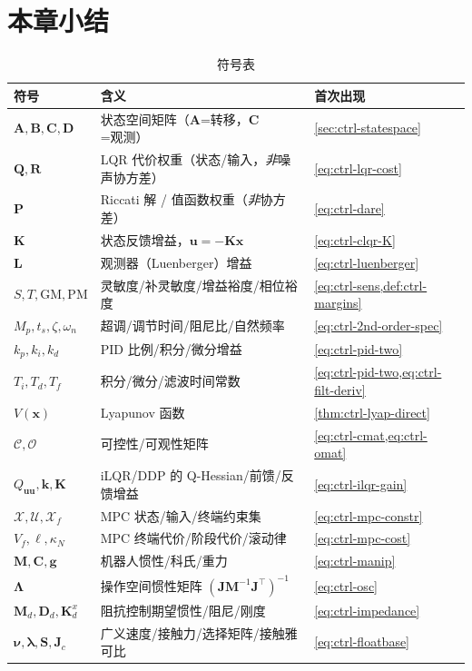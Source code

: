 \section*{本章小结}

\begin{table}[H]\centering\small
\caption{符号表}
\label{tab:ctrl-symbols}
\begin{tabular}{lll}
\toprule
符号 & 含义 & 首次出现 \\
\midrule
$\mathbf{A},\mathbf{B},\mathbf{C},\mathbf{D}$ & 状态空间矩阵（$\mathbf{A}$=转移，$\mathbf{C}$=观测） & \cref{sec:ctrl-statespace} \\
$\mathbf{Q},\mathbf{R}$ & LQR 代价权重（状态/输入，\emph{非}噪声协方差） & \cref{eq:ctrl-lqr-cost} \\
$\mathbf{P}$ & Riccati 解 / 值函数权重（\emph{非}协方差） & \cref{eq:ctrl-dare} \\
$\mathbf{K}$ & 状态反馈增益，$\mathbf{u}=-\mathbf{K}\mathbf{x}$ & \cref{eq:ctrl-clqr-K} \\
$\mathbf{L}$ & 观测器（Luenberger）增益 & \cref{eq:ctrl-luenberger} \\
$S,T,\mathrm{GM},\mathrm{PM}$ & 灵敏度/补灵敏度/增益裕度/相位裕度 & \cref{eq:ctrl-sens,def:ctrl-margins} \\
$M_p,t_s,\zeta,\omega_n$ & 超调/调节时间/阻尼比/自然频率 & \cref{eq:ctrl-2nd-order-spec} \\
$k_p,k_i,k_d$ & PID 比例/积分/微分增益 & \cref{eq:ctrl-pid-two} \\
$T_i,T_d,T_f$ & 积分/微分/滤波时间常数 & \cref{eq:ctrl-pid-two,eq:ctrl-filt-deriv} \\
$V(\mathbf{x})$ & Lyapunov 函数 & \cref{thm:ctrl-lyap-direct} \\
$\mathcal{C},\mathcal{O}$ & 可控性/可观性矩阵 & \cref{eq:ctrl-cmat,eq:ctrl-omat} \\
$Q_{\mathbf{u}\mathbf{u}},\mathbf{k},\mathbf{K}$ & iLQR/DDP 的 Q-Hessian/前馈/反馈增益 & \cref{eq:ctrl-ilqr-gain} \\
$\mathcal{X},\mathcal{U},\mathcal{X}_f$ & MPC 状态/输入/终端约束集 & \cref{eq:ctrl-mpc-constr} \\
$V_f,\ell,\kappa_N$ & MPC 终端代价/阶段代价/滚动律 & \cref{eq:ctrl-mpc-cost} \\
$\mathbf{M},\mathbf{C},\mathbf{g}$ & 机器人惯性/科氏/重力 & \cref{eq:ctrl-manip} \\
$\boldsymbol{\Lambda}$ & 操作空间惯性矩阵 $(\mathbf{J}\mathbf{M}^{-1}\mathbf{J}^\top)^{-1}$ & \cref{eq:ctrl-osc} \\
$\mathbf{M}_d,\mathbf{D}_d,\mathbf{K}_d^x$ & 阻抗控制期望惯性/阻尼/刚度 & \cref{eq:ctrl-impedance} \\
$\boldsymbol{\nu},\boldsymbol{\lambda},\mathbf{S},\mathbf{J}_c$ & 广义速度/接触力/选择矩阵/接触雅可比 & \cref{eq:ctrl-floatbase} \\
\bottomrule
\end{tabular}
\end{table}

